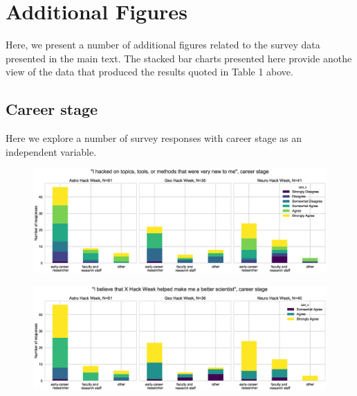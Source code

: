 \documentclass{aastex62}
\begin{document}
\clearpage

\section{Additional Figures}
\label{sec:suppfigures}
Here, we present a number of additional figures related to the survey data presented in the main text. The stacked bar charts presented here provide anothe view of the data that produced the results quoted in Table 1 above.

\subsection{Career stage}

Here we explore a number of survey responses with career stage as an independent variable.

\begin{figure}[h!]
\centering
\includegraphics[width=\textwidth]{Q23_3_Q3_stackedbars.eps}
\caption{}
\label{fig:corr1}
\end{figure}

\begin{figure}[h!]
\centering
\includegraphics[width=\textwidth]{Q24_3_Q3_stackedbars.eps}
\caption{}
\label{fig:corr2}
\end{figure}
\end{document}
